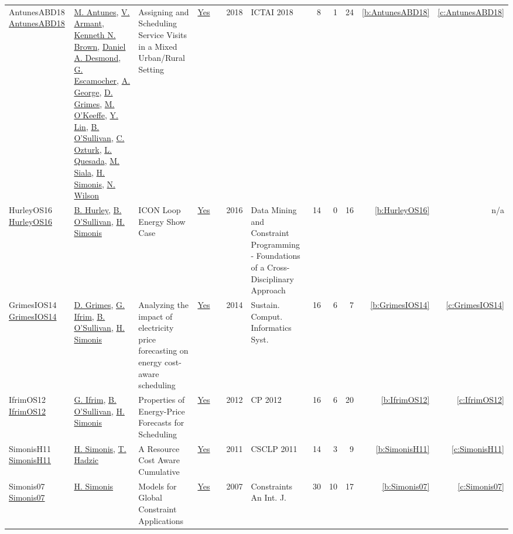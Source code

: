 {\begin{longtable}{>{\raggedright\arraybackslash}p{3cm}>{\raggedright\arraybackslash}p{6cm}>{\raggedright\arraybackslash}p{6.5cm}rrrp{2.5cm}rrrrr}
AntunesABD18 \href{https://doi.org/10.1109/ICTAI.2018.00027}{AntunesABD18} & \hyperref[auth:a891]{M. Antunes}, \hyperref[auth:a892]{V. Armant}, \hyperref[auth:a223]{Kenneth N. Brown}, \hyperref[auth:a893]{Daniel A. Desmond}, \hyperref[auth:a894]{G. Escamocher}, \hyperref[auth:a895]{A. George}, \hyperref[auth:a183]{D. Grimes}, \hyperref[auth:a896]{M. O'Keeffe}, \hyperref[auth:a897]{Y. Lin}, \hyperref[auth:a16]{B. O'Sullivan}, \hyperref[auth:a898]{C. Ozturk}, \hyperref[auth:a899]{L. Quesada}, \hyperref[auth:a130]{M. Siala}, \hyperref[auth:a17]{H. Simonis}, \hyperref[auth:a838]{N. Wilson} & Assigning and Scheduling Service Visits in a Mixed Urban/Rural Setting & \href{../works/AntunesABD18.pdf}{Yes} & \cite{AntunesABD18} & 2018 & ICTAI 2018 & 8 & 1 & 24 & \ref{b:AntunesABD18} & \ref{c:AntunesABD18}\\
HurleyOS16 \href{https://doi.org/10.1007/978-3-319-50137-6\_15}{HurleyOS16} & \hyperref[auth:a900]{B. Hurley}, \hyperref[auth:a16]{B. O'Sullivan}, \hyperref[auth:a17]{H. Simonis} & {ICON} Loop Energy Show Case & \href{../works/HurleyOS16.pdf}{Yes} & \cite{HurleyOS16} & 2016 & Data Mining and Constraint Programming - Foundations of a Cross-Disciplinary Approach & 14 & 0 & 16 & \ref{b:HurleyOS16} & n/a\\
GrimesIOS14 \href{https://doi.org/10.1016/j.suscom.2014.08.009}{GrimesIOS14} & \hyperref[auth:a183]{D. Grimes}, \hyperref[auth:a184]{G. Ifrim}, \hyperref[auth:a16]{B. O'Sullivan}, \hyperref[auth:a17]{H. Simonis} & Analyzing the impact of electricity price forecasting on energy cost-aware scheduling & \href{../works/GrimesIOS14.pdf}{Yes} & \cite{GrimesIOS14} & 2014 & Sustain. Comput. Informatics Syst. & 16 & 6 & 7 & \ref{b:GrimesIOS14} & \ref{c:GrimesIOS14}\\
IfrimOS12 \href{https://doi.org/10.1007/978-3-642-33558-7\_68}{IfrimOS12} & \hyperref[auth:a184]{G. Ifrim}, \hyperref[auth:a16]{B. O'Sullivan}, \hyperref[auth:a17]{H. Simonis} & Properties of Energy-Price Forecasts for Scheduling & \href{../works/IfrimOS12.pdf}{Yes} & \cite{IfrimOS12} & 2012 & CP 2012 & 16 & 6 & 20 & \ref{b:IfrimOS12} & \ref{c:IfrimOS12}\\
SimonisH11 \href{http://dx.doi.org/10.1007/978-3-642-19486-3_5}{SimonisH11} & \hyperref[auth:a17]{H. Simonis}, \hyperref[auth:a924]{T. Hadzic} & A Resource Cost Aware Cumulative & \href{../works/SimonisH11.pdf}{Yes} & \cite{SimonisH11} & 2011 & CSCLP 2011 & 14 & 3 & 9 & \ref{b:SimonisH11} & \ref{c:SimonisH11}\\
Simonis07 \href{https://doi.org/10.1007/s10601-006-9011-7}{Simonis07} & \hyperref[auth:a17]{H. Simonis} & Models for Global Constraint Applications & \href{../works/Simonis07.pdf}{Yes} & \cite{Simonis07} & 2007 & Constraints An Int. J. & 30 & 10 & 17 & \ref{b:Simonis07} & \ref{c:Simonis07}\\

\end{longtable}}

